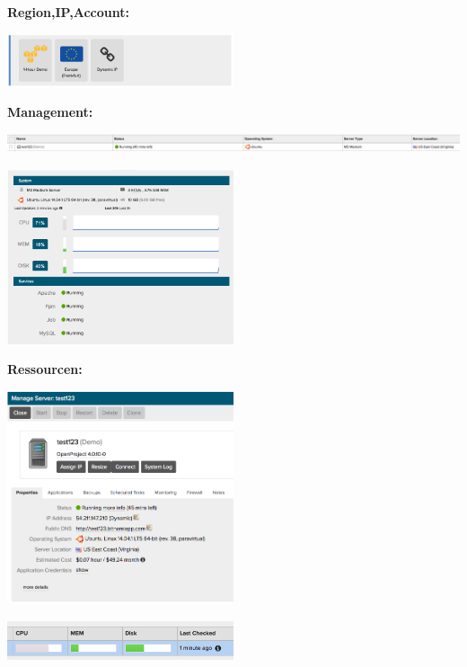 \textbf{Region,IP,Account:}

\includegraphics[width=0.5\textwidth]{./03_Analyse/03_Bitnami/images/aws_random}

\textbf{Management:}

\includegraphics[width=\textwidth]{./03_Analyse/03_Bitnami/images/aws_overview_managment}

\includegraphics[width=0.5\textwidth]{./03_Analyse/03_Bitnami/images/aws_resourcen}

\textbf{Ressourcen:}

\includegraphics[width=0.5\textwidth]{./03_Analyse/03_Bitnami/images/aws_managment}

\includegraphics[width=0.5\textwidth]{./03_Analyse/03_Bitnami/images/aws_resrouces}

\newpage
